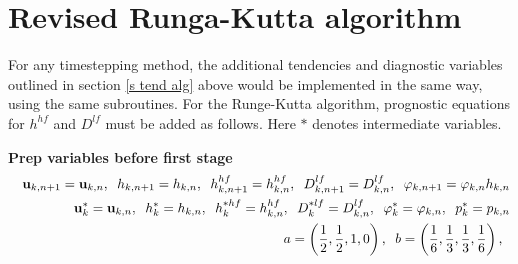 \documentclass[11pt]{report}
\begin{document}
\newpage
\section{Revised Runga-Kutta algorithm}

For any timestepping method, the additional tendencies and diagnostic variables outlined in section \ref{s tend alg} above would be implemented in the same way, using the same subroutines.  For the Runge-Kutta algorithm, prognostic equations for $h^{hf}$ and $D^{lf}$ must be added as follows.  Here $*$ denotes intermediate variables.

{\bf Prep variables before first stage}
\begin{eqnarray} &&
{\bf u}_{k,n+1}={\bf u}_{k,n}, \;\;
h_{k,n+1}=h_{k,n},\;\;
h^{hf}_{k,n+1}=h^{hf}_{k,n},\;\;
D^{lf}_{k,n+1}=D^{lf}_{k,n},\;\;
{\varphi}_{k,n+1} = {\varphi}_{k,n} h_{k,n}
\\&&
{\bf u}_k^*={\bf u}_{k,n}, \;\;
h_k^*=h_{k,n},\;\;
h^{*hf}_k=h^{hf}_{k,n},\;\;
D^{*lf}_k=D^{lf}_{k,n},\;\;
{\varphi}_k^* = {\varphi}_{k,n}, \;\;
p_k^*=p_{k,n}
\\&&
a = \left(\frac{1}{2},\frac{1}{2},1,0 \right),\;\;
b = \left(\frac{1}{6},\frac{1}{3},\frac{1}{3},\frac{1}{6}\right),\;\;
\end{eqnarray}
\end{document}
